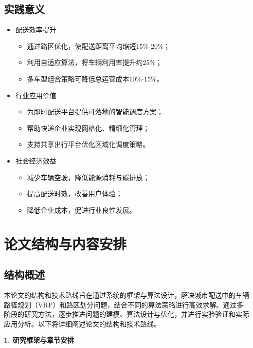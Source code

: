 \documentclass[12pt,a4paper,twoside]{ctexbook}
\begin{document}
\subsection{实践意义}
\begin{itemize}
    \item 配送效率提升
    \begin{itemize}
        \item 通过路区优化，使配送距离平均缩短15\%-20\%；
        \item 利用自适应算法，将车辆利用率提升约25\%；
        \item 多车型组合策略可降低总运营成本10\%-15\%。
    \end{itemize}
    
    \item 行业应用价值
    \begin{itemize}
        \item 为即时配送平台提供可落地的智能调度方案；
        \item 帮助快递企业实现网格化、精细化管理；
        \item 支持共享出行平台优化区域化调度策略。
    \end{itemize}
    
    \item 社会经济效益
    \begin{itemize}
        \item 减少车辆空驶，降低能源消耗与碳排放；
        \item 提高配送时效，改善用户体验；
        \item 降低企业成本，促进行业良性发展。
    \end{itemize}
\end{itemize}

\section{论文结构与内容安排}

\subsection{结构概述}

本论文的结构和技术路线旨在通过系统的框架与算法设计，解决城市配送中的车辆路径规划（VRP）和路区划分问题，结合不同的算法策略进行高效求解。通过多阶段的研究方法，逐步推进问题的建模、算法设计与优化，并进行实验验证和实际应用分析。以下将详细阐述论文的结构和技术路线。

\textbf{1. 研究框架与章节安排}
\end{document}
